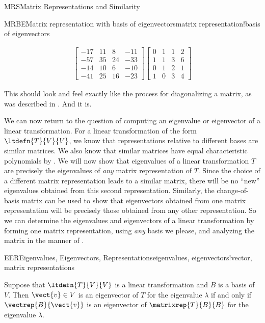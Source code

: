 \begin{subsect}{MRS}{Matrix Representations and Similarity}
\begin{example}{MRBE}{Matrix representation with basis of eigenvectors}{matrix representation!basis of eigenvectors}
\begin{para}
\begin{align*}
\begin{bmatrix}
 -17 & 11 & 8 & -11 \\
 -57 & 35 & 24 & -33 \\
 -14 & 10 & 6 & -10 \\
 -41 & 25 & 16 & -23
\end{bmatrix}
%
\begin{bmatrix}
 0 & 1 & 1 & 2 \\
 1 & 1 & 3 & 6 \\
 0 & 1 & 2 & 1 \\
 1 & 0 & 3 & 4
\end{bmatrix}
%
\end{align*}
\end{para}
%
\begin{para}This should look and feel exactly like the process for diagonalizing a matrix, as was described in .  And it is.\end{para}
%
\end{example}
%
%
\begin{para}We can now return to the question of computing an eigenvalue or eigenvector of a linear transformation.  For a linear transformation of the form $\ltdefn{T}{V}{V}$, we know that representations relative to different bases are similar matrices.  We also know that similar matrices have equal characteristic polynomials by .   We will now show that eigenvalues of a linear transformation $T$ are precisely the eigenvalues of {\em any} matrix representation of $T$.  Since the choice of a different matrix representation leads to a similar matrix, there will be no ``new'' eigenvalues obtained from this second representation.  Similarly, the change-of-basis matrix can be used to show that eigenvectors obtained from one matrix representation will be precisely those obtained from any other representation.  So we can determine the eigenvalues and eigenvectors of a linear transformation by forming one matrix representation, using {\em any} basis we please, and analyzing the matrix in the manner of .\end{para}
%
\begin{theorem}{EER}{Eigenvalues, Eigenvectors, Representations}{eigenvalues, eigenvectors!vector, matrix representations}
\begin{para}Suppose that $\ltdefn{T}{V}{V}$ is a linear transformation and $B$ is a basis of $V$.  Then $\vect{v}\in V$ is an eigenvector of $T$ for the eigenvalue $\lambda$ if and only if $\vectrep{B}{\vect{v}}$ is an eigenvector of $\matrixrep{T}{B}{B}$ for the eigenvalue $\lambda$.\end{para}

\end{theorem}
\end{subsect}

